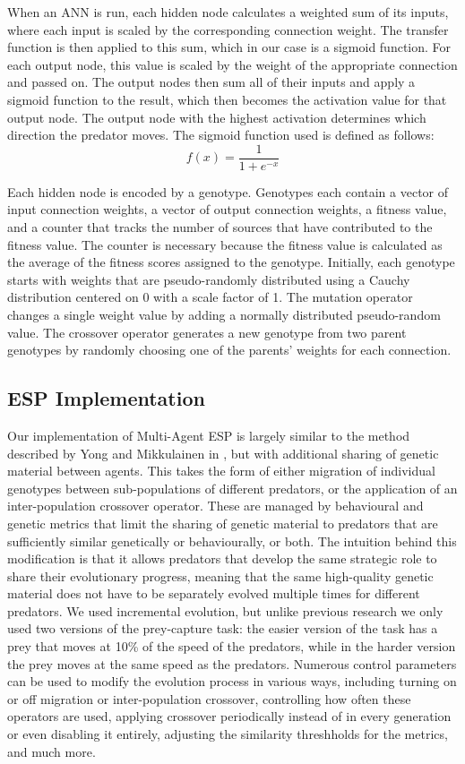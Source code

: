 \documentclass[12pt]{article} %
\begin{document}
When an ANN is run, each hidden node calculates a weighted sum of its inputs, where each input is scaled by the corresponding connection weight. The transfer function is then applied to this sum, which in our case is a sigmoid function. For each output node, this value is scaled by the weight of the appropriate connection and passed on. The output nodes then sum all of their inputs and apply a sigmoid function to the result, which then becomes the activation value for that output node. The output node with the highest activation determines which direction the predator moves. The sigmoid function used is defined as follows:
\[
f(x) = \frac{1}{1 + e^{-x}}
\]

Each hidden node is encoded by a genotype. Genotypes each contain a vector of input connection weights, a vector of output connection weights, a fitness value, and a counter that tracks the number of sources that have contributed to the fitness value. The counter is necessary because the fitness value is calculated as the average of the fitness scores assigned to the genotype. Initially, each genotype starts with weights that are pseudo-randomly distributed using a Cauchy distribution \cite{Rudolph1997} centered on 0 with a scale factor of 1. The mutation operator changes a single weight value by adding a normally distributed pseudo-random value. The crossover operator generates a new genotype from two parent genotypes by randomly choosing one of the parents' weights for each connection.

\subsection{ESP Implementation}

Our implementation of Multi-Agent ESP is largely similar to the method described by Yong and Mikkulainen in \cite{Yong2001}, but with additional sharing of genetic material between agents. This takes the form of either migration of individual genotypes between sub-populations of different predators, or the application of an inter-population crossover operator. These are managed by behavioural and genetic metrics that limit the sharing of genetic material to predators that are sufficiently similar genetically or behaviourally, or both. The intuition behind this modification is that it allows predators that develop the same strategic role to share their evolutionary progress, meaning that the same high-quality genetic material does not have to be separately evolved multiple times for different predators. We used incremental evolution, but unlike previous research we only used two versions of the prey-capture task: the easier version of the task has a prey that moves at 10\% of the speed of the predators, while in the harder version the prey moves at the same speed as the predators. Numerous control parameters can be used to modify the evolution process in various ways, including turning on or off migration or inter-population crossover, controlling how often these operators are used, applying crossover periodically instead of in every generation or even disabling it entirely, adjusting the similarity threshholds for the metrics, and much more.
\end{document}
